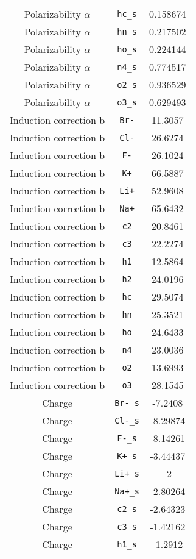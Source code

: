 \begin{table}[ht]
\begin{tabular}{|c|c|c|}
Polarizability $\alpha$ & \verb^hc_s^ & 0.158674 \\ 
Polarizability $\alpha$ & \verb^hn_s^ & 0.217502 \\ 
Polarizability $\alpha$ & \verb^ho_s^ & 0.224144 \\ 
Polarizability $\alpha$ & \verb^n4_s^ & 0.774517 \\ 
Polarizability $\alpha$ & \verb^o2_s^ & 0.936529 \\ 
Polarizability $\alpha$ & \verb^o3_s^ & 0.629493 \\ 
Induction correction b & \verb^Br-^ & 11.3057 \\ 
Induction correction b & \verb^Cl-^ & 26.6274 \\ 
Induction correction b & \verb^F-^ & 26.1024 \\ 
Induction correction b & \verb^K+^ & 66.5887 \\ 
Induction correction b & \verb^Li+^ & 52.9608 \\ 
Induction correction b & \verb^Na+^ & 65.6432 \\ 
Induction correction b & \verb^c2^ & 20.8461 \\ 
Induction correction b & \verb^c3^ & 22.2274 \\ 
Induction correction b & \verb^h1^ & 12.5864 \\ 
Induction correction b & \verb^h2^ & 24.0196 \\ 
Induction correction b & \verb^hc^ & 29.5074 \\ 
Induction correction b & \verb^hn^ & 25.3521 \\ 
Induction correction b & \verb^ho^ & 24.6433 \\ 
Induction correction b & \verb^n4^ & 23.0036 \\ 
Induction correction b & \verb^o2^ & 13.6993 \\ 
Induction correction b & \verb^o3^ & 28.1545 \\ 
Charge & \verb^Br-_s^ & -7.2408 \\ 
Charge & \verb^Cl-_s^ & -8.29874 \\ 
Charge & \verb^F-_s^ & -8.14261 \\ 
Charge & \verb^K+_s^ & -3.44437 \\ 
Charge & \verb^Li+_s^ & -2 \\ 
Charge & \verb^Na+_s^ & -2.80264 \\ 
Charge & \verb^c2_s^ & -2.64323 \\ 
Charge & \verb^c3_s^ & -1.42162 \\ 
Charge & \verb^h1_s^ & -1.2912 \\ 

\end{tabular}
\end{table}

